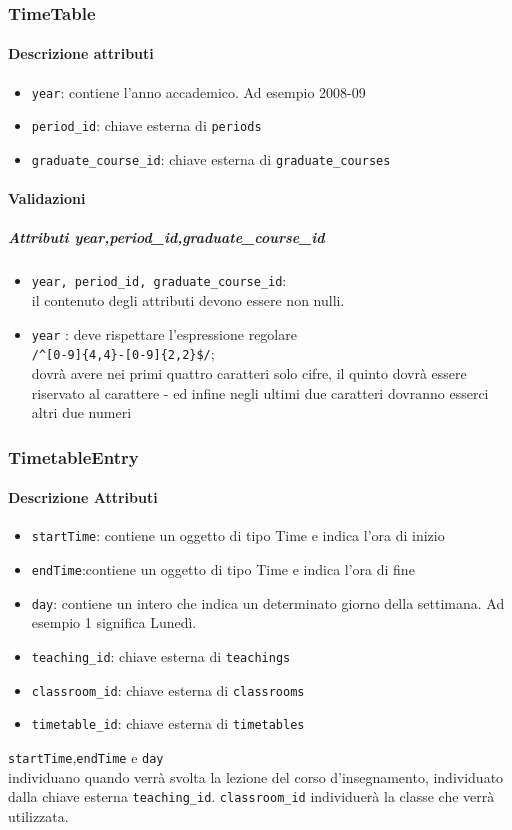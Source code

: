 \documentclass[11pt,a4paper]{article}
\begin{document}
\subsubsection{TimeTable}
\paragraph{Descrizione attributi}
 \begin{itemize}
  \item \verb|year|: contiene l'anno accademico. Ad esempio 2008-09
  \item \verb|period_id|: chiave esterna di \verb|periods|
  \item \verb|graduate_course_id|: chiave esterna di \verb|graduate_courses|
 \end{itemize}
\paragraph{Validazioni}
\subparagraph{Attributi year,period\_id,graduate\_course\_id}
\begin{itemize}
 \item \verb|year, period_id, graduate_course_id|:\\
 il contenuto degli attributi devono essere non nulli.
 \item \verb|year| : deve rispettare l'espressione regolare\\ \verb|/^[0-9]{4,4}-[0-9]{2,2}$/|;\\ dovrà avere nei primi quattro caratteri solo cifre, il quinto dovrà essere riservato al carattere - ed infine negli ultimi due caratteri dovranno esserci altri due numeri
 \end{itemize}
\subsubsection{TimetableEntry}
\paragraph{Descrizione Attributi}
\begin{itemize}
 \item \verb|startTime|: contiene un oggetto di tipo Time e indica l'ora di inizio
 \item \verb|endTime|:contiene un oggetto di tipo Time e indica l'ora di fine
 \item \verb|day|: contiene un intero che indica un determinato giorno della settimana. Ad esempio 1 significa Lunedì.
 \item \verb|teaching_id|: chiave esterna di \verb|teachings|
 \item \verb|classroom_id|: chiave esterna di \verb|classrooms|
 \item \verb|timetable_id|: chiave esterna di \verb|timetables|
\end{itemize}
\verb|startTime|,\verb|endTime| e \verb|day|\\ individuano quando verrà svolta la lezione del corso d'insegnamento, individuato dalla chiave esterna \verb|teaching_id|. \verb|classroom_id| individuerà la classe che verrà utilizzata.
\end{document}
